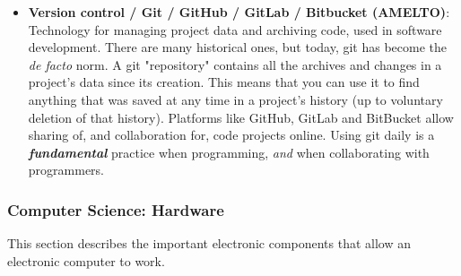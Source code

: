 \documentclass{article}
\begin{document}
\begin{itemize}
	\item \textbf{Version control / Git / GitHub / GitLab / Bitbucket (AMELTO)}: Technology for managing project data and archiving code, used in software development. There are many historical ones, but today, git has become the \textit{de facto} norm. A git "repository" contains all the archives and changes in a project's data since its creation. This means that you can use it to find anything that was saved at any time in a project's history (up to voluntary deletion of that history). Platforms like GitHub, GitLab and BitBucket allow sharing of, and collaboration for, code projects online. Using git daily is a \textbf{\textit{fundamental}} practice when programming, \textit{and} when collaborating with programmers.

\end{itemize}



\subsubsection*{Computer Science: Hardware}

This section describes the important electronic components that allow an electronic computer to work.
\end{document}
